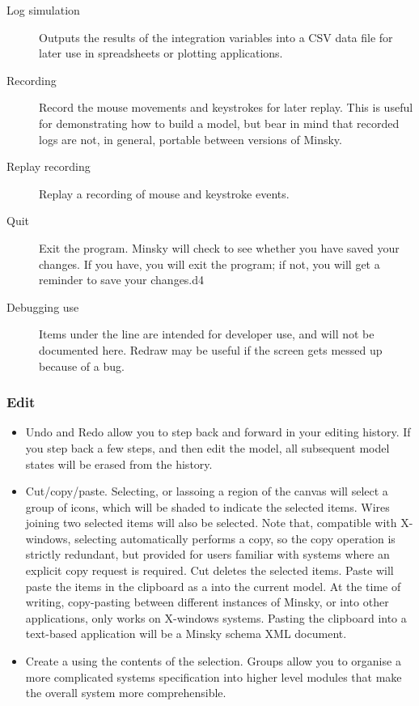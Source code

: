 \begin{description}
\item[Log simulation] Outputs the results of the integration variables
into a CSV data file for later use in spreadsheets or plotting
applications.

\item[Recording] Record the mouse movements and keystrokes for later
replay. This is useful for demonstrating how to build a model, but
bear in mind that recorded logs are not, in general, portable between
versions of Minsky.

\item[Replay recording] Replay a recording of mouse and keystroke events.

\item[Quit] Exit the program. Minsky will check to see whether you have saved your changes. If you have, you will exit the program; if not, you will get a reminder to save your changes.d4

\item[Debugging use] Items under the line are intended for developer
  use, and will not be documented here. Redraw may be useful if the
  screen gets messed up because of a bug.

\end{description}

\subsubsection{Edit}
\label{Edit}

\begin{itemize}
\item\label{edit:undo} Undo and Redo allow you to step back and forward in your editing
history. If you step back a few steps, and then edit the model, all
subsequent model states will be erased from the history.

\item\label{edit:copy} Cut/copy/paste. Selecting, or lassoing a region
of the canvas will select a group of icons, which will be shaded to
indicate the selected items. Wires joining two selected items will
also be selected. Note that, compatible with X-windows, selecting
automatically performs a copy, so the copy operation is strictly
redundant, but provided for users familiar with systems where an
explicit copy request is required. Cut deletes the selected
items. Paste will paste the items in the clipboard as a
 into the current model. At the time of writing,
copy-pasting between different instances of Minsky, or into other
applications, only works on X-windows systems. Pasting the clipboard
into a text-based application will be a Minsky schema XML document.

\item\label{edit:group} Create a  using the
contents of the selection. Groups allow you to organise a more
complicated systems specification into higher level modules that make
the overall system more comprehensible.

\end{itemize}

